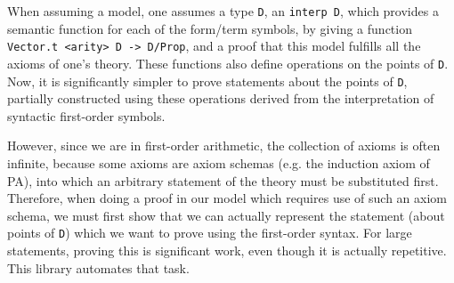 \documentclass[11pt,a4paper]{article}
\begin{document}
When assuming a model, one assumes a type \lstinline|D|, an \lstinline|interp D|, which provides a semantic function for each of the form/term symbols, by giving a function \lstinline|Vector.t <arity> D -> D/Prop|, and a proof that this model fulfills all the axioms of one's theory. These functions also define operations on the points of \lstinline|D|. Now, it is significantly simpler to prove statements about the points of \lstinline|D|, partially constructed using these operations derived from the interpretation of syntactic first-order symbols.

However, since we are in first-order arithmetic, the collection of axioms is often infinite, because some axioms are axiom schemas (e.g. the induction axiom of PA), into which an arbitrary statement of the theory must be substituted first. Therefore, when doing a proof in our model which requires use of such an axiom schema, we must first show that we can actually represent the statement (about points of \lstinline|D|) which we want to prove using the first-order syntax. For large statements, proving this is significant work, even though it is actually repetitive. This library automates that task.
\newpage
\end{document}
